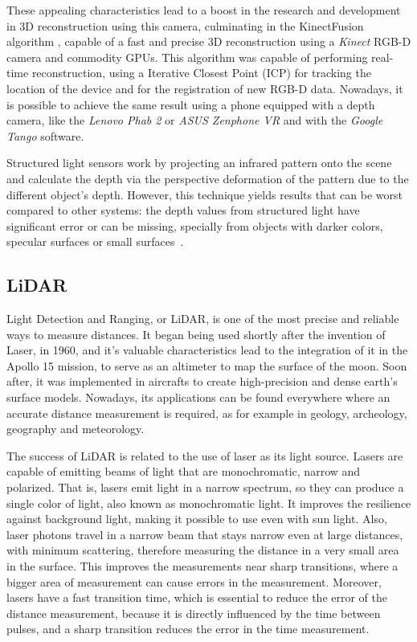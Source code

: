 These appealing characteristics lead to a boost in the research and development in 3D reconstruction using this camera, culminating in the KinectFusion algorithm \cite{newcombe11}, capable of a fast and precise 3D reconstruction using a \textit{Kinect} RGB-D camera and commodity GPUs. This algorithm was capable of performing real-time reconstruction, using a Iterative Closest Point (ICP) for tracking the location of the device and for the registration of new RGB-D data. Nowadays, it is possible to achieve the same result using a phone equipped with a depth camera, like the \textit{Lenovo Phab 2} or \textit{ASUS Zenphone VR} and with the \textit{Google Tango} software. 

Structured light sensors work by projecting an infrared pattern onto the scene and calculate the depth via the perspective deformation of the pattern due to the different object's depth. However, this technique yields results that can be worst compared to other systems: the depth values from structured light have significant error or can be missing, specially from objects with darker colors, specular surfaces or small surfaces~\cite{shen13}. 

\subsection{LiDAR}

Light Detection and Ranging, or LiDAR, is one of the most precise and reliable ways to measure distances. It began being used shortly after the invention of Laser, in 1960, and it's valuable characteristics lead to the integration of it in the Apollo 15 mission, to serve as an altimeter to map the surface of the moon. Soon after, it was implemented in aircrafts to create high-precision and dense earth's surface models. Nowadays, its applications can be found everywhere where an accurate distance measurement is required, as for example in geology, archeology, geography and meteorology.

The success of LiDAR is related to the use of laser as its light source. Lasers are capable of emitting beams of light that are monochromatic, narrow and polarized. That is, lasers emit light in a narrow spectrum, so they can produce a single color of light, also known as monochromatic light. It improves the resilience against background light, making it possible to use even with sun light. Also, laser photons travel in a narrow beam that stays narrow even at large distances, with minimum scattering, therefore measuring the distance in a very small area in the surface. This improves the measurements near sharp transitions, where a bigger area of measurement can cause errors in the measurement. Moreover, lasers have a fast transition time, which is essential to reduce the error of the distance measurement, because it is directly influenced by the time between pulses, and a sharp transition reduces the error in the time measurement. 

